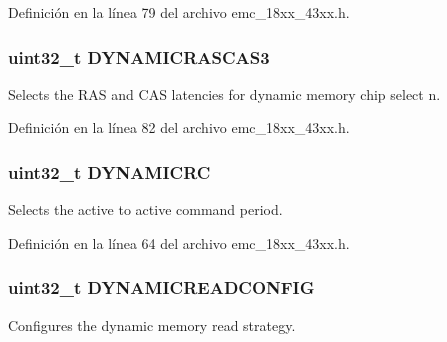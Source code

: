Definición en la línea 79 del archivo emc\+\_\+18xx\+\_\+43xx.\+h.

\subsubsection[{\texorpdfstring{D\+Y\+N\+A\+M\+I\+C\+R\+A\+S\+C\+A\+S3}{DYNAMICRASCAS3}}]{ uint32\+\_\+t D\+Y\+N\+A\+M\+I\+C\+R\+A\+S\+C\+A\+S3}\hypertarget{struct_l_p_c___e_m_c___t_ad19a883764dd0989953c9701367c2d5f}{}\label{struct_l_p_c___e_m_c___t_ad19a883764dd0989953c9701367c2d5f}
Selects the R\+AS and C\+AS latencies for dynamic memory chip select n. 

Definición en la línea 82 del archivo emc\+\_\+18xx\+\_\+43xx.\+h.

\subsubsection[{\texorpdfstring{D\+Y\+N\+A\+M\+I\+C\+RC}{DYNAMICRC}}]{ uint32\+\_\+t D\+Y\+N\+A\+M\+I\+C\+RC}\hypertarget{struct_l_p_c___e_m_c___t_ad2eafb5252db632370d27ecb3e0bb485}{}\label{struct_l_p_c___e_m_c___t_ad2eafb5252db632370d27ecb3e0bb485}
Selects the active to active command period. 

Definición en la línea 64 del archivo emc\+\_\+18xx\+\_\+43xx.\+h.

\subsubsection[{\texorpdfstring{D\+Y\+N\+A\+M\+I\+C\+R\+E\+A\+D\+C\+O\+N\+F\+IG}{DYNAMICREADCONFIG}}]{ uint32\+\_\+t D\+Y\+N\+A\+M\+I\+C\+R\+E\+A\+D\+C\+O\+N\+F\+IG}\hypertarget{struct_l_p_c___e_m_c___t_a149b0b6e335a0991a3202867ef62f6b5}{}\label{struct_l_p_c___e_m_c___t_a149b0b6e335a0991a3202867ef62f6b5}
Configures the dynamic memory read strategy. 

